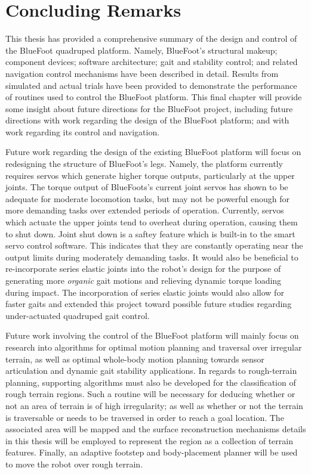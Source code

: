 \chapter{Concluding Remarks}


This thesis has provided a comprehensive summary of the design and control of the BlueFoot quadruped platform. Namely, BlueFoot's structural makeup; component devices; software architecture; gait and stability control; and related navigation control mechanisms have been described in detail. Results from simulated and actual trials have been provided to demonstrate the performance of routines used to control the BlueFoot platform. This final chapter will provide some insight about future directions for the BlueFoot project, including future directions with work regarding the design of the BlueFoot platform; and with work regarding its control and navigation.


Future work regarding the design of the existing BlueFoot platform will focus on redesigning the structure of BlueFoot's legs. Namely, the platform currently requires servos which generate higher torque outputs, particularly at the upper joints. The torque output of BlueFoots's current joint servos has shown to be adequate for moderate locomotion tasks, but may not be powerful enough for more demanding tasks over extended periods of operation. Currently, servos which actuate the upper joints tend to overheat during operation, causing them to shut down. Joint shut down is a saftey feature which is built-in to the smart servo control software. This indicates that they are constantly operating near the output limits during moderately demanding tasks. It would also be beneficial to re-incorporate series elastic joints into the robot's design for the purpose of generating more \emph{organic} gait motions and relieving dynamic torque loading during impact. The incorporation of series elastic joints would also allow for faster gaits and extended this project toward possible future studies regarding under-actuated quadruped gait control.


Future work involving the control of the BlueFoot platform will mainly focus on research into algorithms for optimal motion planning and traversal over irregular terrain, as well as optimal whole-body motion planning towards sensor articulation and dynamic gait stability applications. In regards to rough-terrain planning, supporting algorithms must also be developed for the classification of rough terrain regions. Such a routine will be necessary for deducing whether or not an area of terrain is of high irregularity; as well as whether or not the terrain is traversable or needs to be traversed in order to reach a goal location. The associated area will be mapped and the surface reconstruction mechanisms details in this thesis will be employed to represent the region as a collection of terrain features. Finally, an adaptive footstep and body-placement planner will be used to move the robot over rough terrain. 


